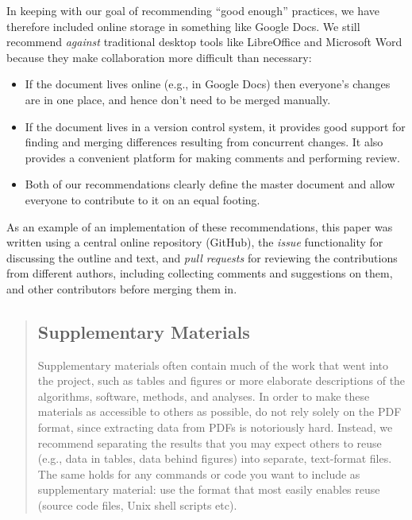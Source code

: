 \documentclass[10pt]{article}
\begin{document}
In keeping with our goal of recommending ``good enough'' practices, we
have therefore included online storage in something like Google Docs. We
still recommend \emph{against} traditional desktop tools like
LibreOffice and Microsoft Word because they make collaboration more
difficult than necessary:

\begin{itemize}
\item
  If the document lives online (e.g., in Google Docs) then everyone's
  changes are in one place, and hence don't need to be merged manually.
\item
  If the document lives in a version control system, it provides good
  support for finding and merging differences resulting from concurrent
  changes. It also provides a convenient platform for making comments
  and performing review.
\item
  Both of our recommendations clearly define the master document and
  allow everyone to contribute to it on an equal footing.
\end{itemize}

As an example of an implementation of these recommendations, this paper
was written using a central online repository (GitHub), the \emph{issue}
functionality for discussing the outline and text, and \emph{pull
requests} for reviewing the contributions from different authors,
including collecting comments and suggestions on them, and other
contributors before merging them in.

\begin{quote}
\subsection*{Supplementary Materials}

Supplementary materials often contain much of the work that went into
the project, such as tables and figures or more elaborate descriptions
of the algorithms, software, methods, and analyses. In order to make
these materials as accessible to others as possible, do not rely solely
on the PDF format, since extracting data from PDFs is notoriously hard.
Instead, we recommend separating the results that you may expect others
to reuse (e.g., data in tables, data behind figures) into separate,
text-format files. The same holds for any commands or code you want to
include as supplementary material: use the format that most easily
enables reuse (source code files, Unix shell scripts etc).
\end{quote}
\end{document}
